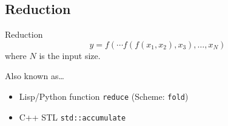 \documentclass[english,compress]{beamer}
\begin{document}
\subsection{Reduction}
\begin{frame}{Reduction}
  {\Huge
  \[
    y =  f(\cdots f(f(x_1, x_2), x_3), \dots ,x_N)
  \]}
  where $N$ is the input size.

  \pause
  \medskip
  Also known as\dots
  \begin{itemize}
    \item Lisp/Python function \texttt{reduce} (Scheme: \texttt{fold})
    \item C++ STL \texttt{std::accumulate}
  \end{itemize}
\end{frame}
\end{document}
